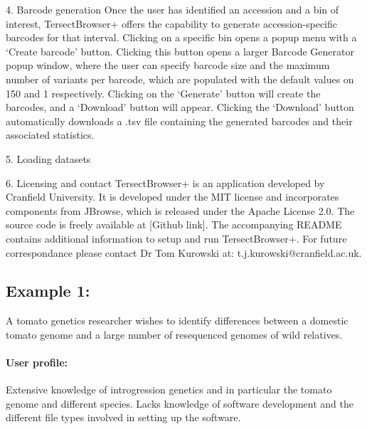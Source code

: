 \documentclass[12pt]{article}
\begin{document}
4. Barcode generation
Once the user has identified an accession and a bin of interest, TersectBrowser+ offers the capability to generate accession-specific barcodes for that interval. Clicking on a specific bin opens a popup menu with a `Create barcode' button. Clicking this button opens a larger Barcode Generator popup window, where the user can specify barcode size and the maximum number of variants per barcode, which are populated with the default values on 150 and 1 respectively. Clicking on the `Generate' button will create the barcodes, and a `Download' button will appear. Clicking the `Download' button automatically downloads a .tsv file containing the generated barcodes and their associated statistics.

5. Loading datasets

6. Licensing and contact
TersectBrowser+ is an application developed by Cranfield University. It is developed under the MIT license and incorporates components from JBrowse, which is released under the Apache License 2.0. The source code is freely available at [Github link]. The accompanying README contains additional information to setup and run TersectBrowser+. For future correspondance please contact Dr Tom Kurowski at: t.j.kurowski@cranfield.ac.uk.

\subsection{Example 1:} A tomato genetics researcher wishes to identify differences between a domestic tomato genome and a large number of resequenced genomes of wild relatives. 

\paragraph{User profile:} Extensive knowledge of introgression genetics and in particular the tomato genome and different species. Lacks knowledge of software development and the different file types involved in setting up the software. 
\end{document}
